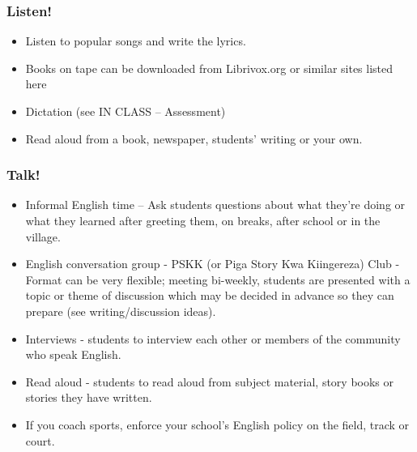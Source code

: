 \documentclass[12pt,a4paper]{report}
\begin{document}
\subsubsection{Listen!}
\begin{itemize}

\item{Listen to popular songs and write the lyrics.}

\item{Books on tape can be downloaded from Librivox.org or similar sites listed here}


\item{Dictation (see IN CLASS – Assessment)}

\item{Read aloud from a book, newspaper, students' writing or your own.}

\end{itemize}

\subsubsection{Talk!}
\begin{itemize}

\item{Informal English time – Ask students questions about what they’re doing or what they learned after greeting them, on breaks, after school or in the village.}

\item{English conversation group - PSKK (or Piga Story Kwa Kiingereza) Club - Format can be very flexible; meeting bi-weekly, students are presented with a topic or theme of discussion which may be decided in advance so they can prepare (see writing/discussion ideas).}

\item{Interviews - students to interview each other or members of the community who speak English.}

\item{Read aloud - students to read aloud from subject material, story books or stories they have written.}

\item{If you coach sports, enforce your school’s English policy on the field, track or court.}
\end{itemize}
\end{document}
